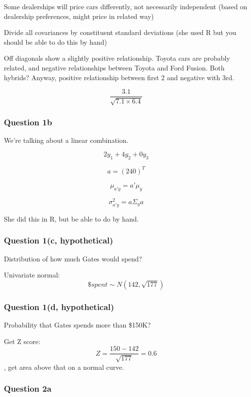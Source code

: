 \documentclass[]{article}
\begin{document}
Some dealerships will price cars differently, not necessarily
independent (based on dealership preferences, might price in related
way)

Divide all covariances by constituent standard deviations (she used R
but you should be able to do this by hand)

Off diagonals show a slightly positive relationship. Toyota cars are
probably related, and negative relationships between Toyota and Ford
Fusion. Both hybrids? Anyway, positive relationship between first 2 and
negative with 3rd.

\[ \frac{3.1}{ \sqrt{7.1 \times 6.4}} \]

\hypertarget{question-1b}{%
\subsubsection{Question 1b}\label{question-1b}}

We're talking about a linear combination.

\[2y_1 + 4y_2 + 0y_3\]

\[a = (2 4 0)^T\]

\[\mu_{a'y} = a'\mu_y\]

\[\sigma_{a'y}^2 = a\Sigma_ya\]

She did this in R, but be able to do by hand.

\hypertarget{question-1c-hypothetical}{%
\subsubsection{Question 1(c,
hypothetical)}\label{question-1c-hypothetical}}

Distribution of how much Gates would spend?

Univariate normal: \[ \$ spent \sim N(142, \sqrt{177}) \]

\hypertarget{question-1d-hypothetical}{%
\subsubsection{Question 1(d,
hypothetical)}\label{question-1d-hypothetical}}

Probability that Gates spends more than \$150K?

Get Z score: \[Z = \frac{150-142}{\sqrt{177}}=0.6 \], get area above
that on a normal curve.

\hypertarget{question-2a}{%
\subsubsection{Question 2a}\label{question-2a}}
\end{document}
